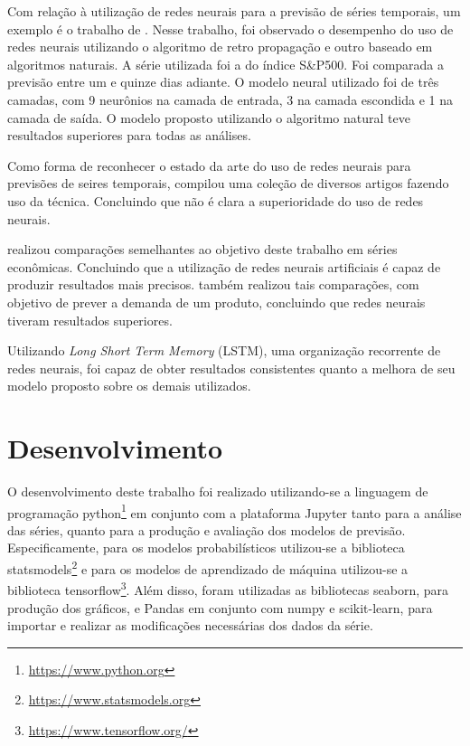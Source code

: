\documentclass[
    12pt,
    oneside,
    a4paper,
    english,
    brazil
]{abntex2}
\begin{document}
Com relação à utilização de redes  neurais para a previsão de séries temporais,
um exemplo é o trabalho de . Nesse trabalho, foi observado
o desempenho do uso de redes neurais utilizando o algoritmo de retro propagação
e  outro baseado  em algoritmos  naturais. A  série utilizada  foi a  do índice
S\&P500. Foi  comparada a  previsão entre  um e quinze  dias adiante.  O modelo
neural utilizado foi de  três camadas, com 9 neurônios na  camada de entrada, 3
na camada  escondida e  1 na camada  de saída. O  modelo proposto  utilizando o
algoritmo natural teve resultados superiores para todas as análises.

Como  forma de  reconhecer  o estado  da  arte  do uso  de  redes neurais  para
previsões  de  seires temporais,    compilou  uma coleção  de
diversos  artigos  fazendo  uso  da  técnica. Concluindo  que  não  é  clara  a
superioridade do uso de redes neurais.

  realizou  comparações  semelhantes ao  objetivo  deste
trabalho  em   séries  econômicas.  Concluindo   que  a  utilização   de  redes
neurais   artificiais   é  capaz   de   produzir   resultados  mais   precisos.
  também realizou  tais  comparações,  com objetivo  de
prever a demanda de um produto, concluindo que redes neurais tiveram resultados
superiores.

Utilizando \textit{Long  Short Term Memory} (LSTM),  uma organização recorrente
de  redes  neurais,     foi  capaz  de  obter  resultados
consistentes  quanto  a  melhora  de   seu  modelo  proposto  sobre  os  demais
utilizados.

\chapter{Desenvolvimento}\label{chap:desenv}

O   desenvolvimento    deste   trabalho    foi   realizado    utilizando-se   a
linguagem   de  programação   python\footnote{\url{https://www.python.org}}  em
conjunto  com   a  plataforma  Jupyter   tanto  para  a  análise   das  séries,
quanto   para   a    produção   e   avaliação   dos    modelos   de   previsão.
Especificamente,    para    os    modelos   probabilísticos    utilizou-se    a
biblioteca   statsmodels\footnote{\url{https://www.statsmodels.org}}   e   para
os   modelos    de   aprendizado   de   máquina    utilizou-se   a   biblioteca
tensorflow\footnote{\url{https://www.tensorflow.org/}}.   Além   disso,   foram
utilizadas  as bibliotecas  seaborn, para  produção dos  gráficos, e  Pandas em
conjunto com  numpy e  scikit-learn, para importar  e realizar  as modificações
necessárias dos dados da série.
\end{document}
